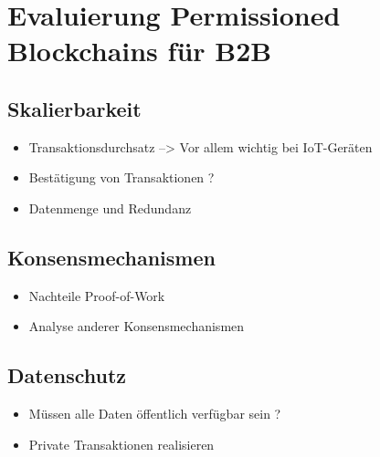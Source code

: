 \chapter{Evaluierung Permissioned Blockchains für B2B}
\label{cha:b2b-eval}

\section{Skalierbarkeit}
\begin{itemize}
    \item Transaktionsdurchsatz --> Vor allem wichtig bei IoT-Geräten
    \item Bestätigung von Transaktionen ?
    \item Datenmenge und Redundanz
\end{itemize}

\label{subsec:eval-konsens}
\section{Konsensmechanismen}
\begin{itemize}
    \item Nachteile Proof-of-Work
    \item Analyse anderer Konsensmechanismen
\end{itemize}

\section{Datenschutz}
\begin{itemize}
    \item Müssen alle Daten öffentlich verfügbar sein ?
    \item Private Transaktionen realisieren
\end{itemize}


